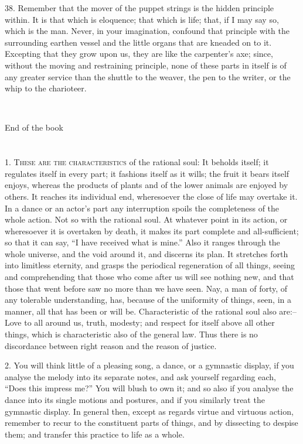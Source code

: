 \documentclass{book}
\newcommand\terminus[1]{\vspace{2em}\emph{#1} \\[2em] \begin{center}End of the \ordinalstring{chapter} book\end{center}}
\begin{document}
38. Remember that the mover of the puppet strings is the hidden
principle within. It is that which is eloquence; that which is life;
that, if I may say so, which is the man. Never, in your imagination,
confound that principle with the surrounding earthen vessel and the
little organs that are kneaded on to it. 
\newpage
Excepting that they grow upon
us, they are like the carpenter's axe; since, without the moving and
restraining principle, none of these parts in itself is of any greater
service than the shuttle to the weaver, the pen to the writer, or the
whip to the charioteer.

\terminus{}
\chapter[These are the characteristics...]{}

1. \textsc{These are the characteristics} of the rational soul: It beholds
itself; it regulates itself in every part; it fashions itself as it
wills; the fruit it bears itself enjoys, whereas the products of
plants and of the lower animals are enjoyed by others. It reaches its
individual end, wheresoever the close of life may overtake it. In a
dance or an actor's part any interruption spoils the completeness of
the whole action. Not so with the rational soul. At whatever point in
its action, or wheresoever it is overtaken by death, it makes its part
complete and all-sufficient; so that it can say, ``I have received what
is mine.'' Also it ranges through the whole universe, and the void
around it, and discerns its plan. It stretches forth into limitless
eternity, and grasps the periodical regeneration of all things, seeing
and comprehending that those who come after us will see nothing new,
and that those that went before saw no more than we have seen. Nay, a
man of forty, of any tolerable understanding, has, because of the
uniformity of things, seen, in a manner, all that has been or will
be. Characteristic of the rational soul also are:--Love to all around
us, truth, modesty; and respect for itself above all other things,
which is characteristic also of the general law. Thus there is no
discordance between right reason and the reason of justice.

2. You will think little of a pleasing song, a dance, or a gymnastic
display, if you analyse the melody into its separate notes, and ask
yourself regarding each, ``Does this impress me?'' You will blush to own
it; and so also if you analyse the dance into its single motions and
postures, and if you similarly treat the gymnastic display. In general
then, except as regards virtue and virtuous action, remember to recur
to the constituent parts of things, and by dissecting to despise them;
and transfer this practice to life as a whole.
\end{document}
